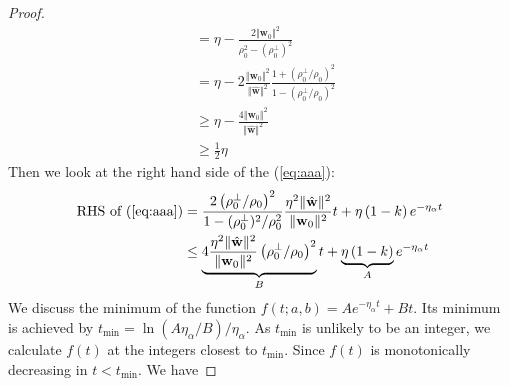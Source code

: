 \documentclass[pdflatex,sn-basic]{sn-jnl}%
\theoremstyle{thmstyleone}%
\begin{document}
\begin{appendices}
\begin{proof}
\begin{equation}
\begin{aligned}
    & = 
    \eta 
    -
    \frac{2 \Vert \mathbf{w}_0 \Vert^{2}}{\rho_0^2 - (\rho_0^{\perp})^2}
    \\ & = 
    \eta 
    -
    2 \frac{\Vert \mathbf{w}_0 \Vert^{2}}{\Vert \hat{\mathbf{w}} \Vert^{2}}
    \frac{1 + (\rho_0^{\perp} / \rho_0)^2}{1 - (\rho_0^{\perp} / \rho_0)^2}
    \\ & \ge
    \eta 
    -
    \frac{4 \Vert \mathbf{w}_0 \Vert^{2}}{\Vert \hat{\mathbf{w}} \Vert^2}
    \\ & \ge \frac{1}{2}\eta
  \end{aligned}
  \end{equation}
  Then we look at the right hand side of the (\ref{eq:aaa}):
  \begin{equation*}
  \begin{aligned}
    \text{RHS of }(\ref{eq:aaa}) & = 
    \frac{2 \left(\rho_{0}^{\perp} / \rho_0\right)^2 }{1 - (\rho_0^{\perp})^2/\rho_0^2}
    \frac{\eta^{2} \Vert \hat{\mathbf{w}} \Vert^2 }{\Vert \mathbf{w}_0 \Vert^2} t
    +
    \eta \left( 1 - k \right)
     e^{-\eta_{\alpha}t} 
    \\ & \le 
    \underbrace{
      4 \frac{\eta^{2} \Vert \hat{\mathbf{w}} \Vert^2 }{\Vert \mathbf{w}_0 \Vert^2} \left(\rho_{0}^{\perp} / \rho_0\right)^2 
    }_{B} t
    +
    \underbrace{
      \eta \left( 1 - k \right)
    }_{
      A
    }
     e^{-\eta_{\alpha}t}
  \end{aligned}
  \end{equation*}
  We discuss the minimum of the function $f(t; a, b) = A e^{-\eta_{\alpha} t} + B t$.
  Its minimum is achieved by $t_{\min} = \ln(A \eta_{\alpha} / B) / \eta_{\alpha}$. 
  As $t_{\min}$ is unlikely to be an integer, we calculate $f(t)$ at the integers closest to $t_{\min}$. 
  Since $f(t)$ is monotonically decreasing in $t < t_{\min}$. We have 

\end{proof}
\end{appendices}
\end{document}
